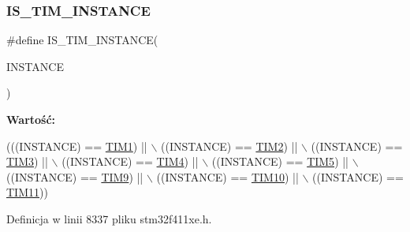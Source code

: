 \mbox{\label{group___exported__macros_gaba506eb03409b21388d7c5a6401a4f98}} 
\subsubsection{\texorpdfstring{I\+S\+\_\+\+T\+I\+M\+\_\+\+I\+N\+S\+T\+A\+N\+CE}{IS\_TIM\_INSTANCE}}
{\footnotesize\ttfamily \#define I\+S\+\_\+\+T\+I\+M\+\_\+\+I\+N\+S\+T\+A\+N\+CE(\begin{DoxyParamCaption}\item[{}]{I\+N\+S\+T\+A\+N\+CE }\end{DoxyParamCaption})}

{\bfseries Wartość\+:}
\begin{DoxyCode}
(((INSTANCE) == \hyperlink{group___peripheral__declaration_ga2e87451fea8dc9380056d3cfc5ed81fb}{TIM1})   || \(\backslash\)
                                   ((INSTANCE) == \hyperlink{group___peripheral__declaration_ga3cfac9f2e43673f790f8668d48b4b92b}{TIM2})   || \(\backslash\)
                                   ((INSTANCE) == \hyperlink{group___peripheral__declaration_ga61ee4c391385607d7af432b63905fcc9}{TIM3})   || \(\backslash\)
                                   ((INSTANCE) == \hyperlink{group___peripheral__declaration_ga91a09bad8bdc7a1cb3d85cf49c94c8ec}{TIM4})   || \(\backslash\)
                                   ((INSTANCE) == \hyperlink{group___peripheral__declaration_ga5125ff6a23a2ed66e2e19bd196128c14}{TIM5})   || \(\backslash\)
                                   ((INSTANCE) == \hyperlink{group___peripheral__declaration_gaf52b4b4c36110a0addfa98059f54a50e}{TIM9})   || \(\backslash\)
                                   ((INSTANCE) == \hyperlink{group___peripheral__declaration_ga46b2ad3f5f506f0f8df0d2ec3e767267}{TIM10})  || \(\backslash\)
                                   ((INSTANCE) == \hyperlink{group___peripheral__declaration_gacfd11ef966c7165f57e2cebe0abc71ad}{TIM11}))
\end{DoxyCode}


Definicja w linii 8337 pliku stm32f411xe.\+h.

\mbox{\label{group___exported__macros_ga98104b1522d066b0c20205ca179d0eba}} 
